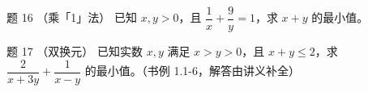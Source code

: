 \begin{problem}{题 16 （乘「1」法）}
已知 $x,y>0$，且 $\dfrac1x+\dfrac9y=1$，求 $x+y$ 的最小值。
\end{problem}

\begin{problem}{题 17 \starred\starred（双换元）}
已知实数 $x,y$ 满足 $x>y>0$，且 $x+y\le 2$，求 $\dfrac{2}{x+3y}+\dfrac{1}{x-y}$ 的最小值。（书例 1.1-6，解答由讲义补全）
\end{problem}

\clearpage
